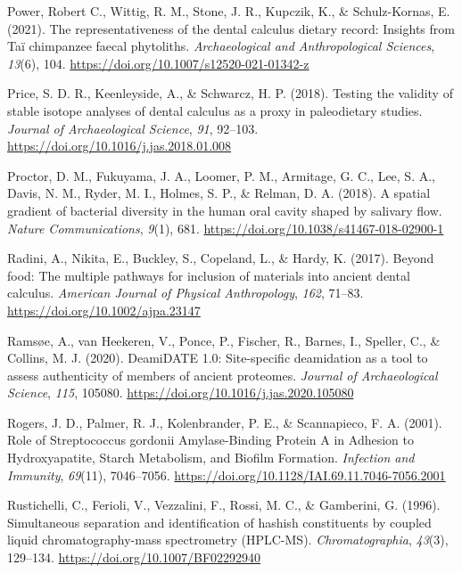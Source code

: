 \documentclass[
  letterpaper,
]{book}
\newlength{\cslhangindent}
\newlength{\cslentryspacingunit} %
\newenvironment{CSLReferences}[2] %
 {%
  \setlength{\parindent}{0pt}
  \ifodd #1
  \let\oldpar\par
  \def\par{\hangindent=\cslhangindent\oldpar}
  \fi
  \setlength{\parskip}{#2\cslentryspacingunit}
 }%
 {}
\begin{document}
\begin{CSLReferences}{1}{0}
\leavevmode{}%
Power, Robert C., Wittig, R. M., Stone, J. R., Kupczik, K., \&
Schulz-Kornas, E. (2021). The representativeness of the dental calculus
dietary record: Insights from {Taï} chimpanzee faecal phytoliths.
\emph{Archaeological and Anthropological Sciences}, \emph{13}(6), 104.
\url{https://doi.org/10.1007/s12520-021-01342-z}

\leavevmode{}%
Price, S. D. R., Keenleyside, A., \& Schwarcz, H. P. (2018). Testing the
validity of stable isotope analyses of dental calculus as a proxy in
paleodietary studies. \emph{Journal of Archaeological Science},
\emph{91}, 92--103. \url{https://doi.org/10.1016/j.jas.2018.01.008}

\leavevmode{}%
Proctor, D. M., Fukuyama, J. A., Loomer, P. M., Armitage, G. C., Lee, S.
A., Davis, N. M., Ryder, M. I., Holmes, S. P., \& Relman, D. A. (2018).
A spatial gradient of bacterial diversity in the human oral cavity
shaped by salivary flow. \emph{Nature Communications}, \emph{9}(1), 681.
\url{https://doi.org/10.1038/s41467-018-02900-1}

\leavevmode{}%
Radini, A., Nikita, E., Buckley, S., Copeland, L., \& Hardy, K. (2017).
Beyond food: {The} multiple pathways for inclusion of materials into
ancient dental calculus. \emph{American Journal of Physical
Anthropology}, \emph{162}, 71--83.
\url{https://doi.org/10.1002/ajpa.23147}

\leavevmode{}%
Ramsøe, A., van Heekeren, V., Ponce, P., Fischer, R., Barnes, I.,
Speller, C., \& Collins, M. J. (2020). {DeamiDATE} 1.0: {Site-specific}
deamidation as a tool to assess authenticity of members of ancient
proteomes. \emph{Journal of Archaeological Science}, \emph{115}, 105080.
\url{https://doi.org/10.1016/j.jas.2020.105080}

\leavevmode{}%
Rogers, J. D., Palmer, R. J., Kolenbrander, P. E., \& Scannapieco, F. A.
(2001). Role of {Streptococcus} gordonii {Amylase-Binding Protein A} in
{Adhesion} to {Hydroxyapatite}, {Starch Metabolism}, and {Biofilm
Formation}. \emph{Infection and Immunity}, \emph{69}(11), 7046--7056.
\url{https://doi.org/10.1128/IAI.69.11.7046-7056.2001}

\leavevmode{}%
Rustichelli, C., Ferioli, V., Vezzalini, F., Rossi, M. C., \& Gamberini,
G. (1996). Simultaneous separation and identification of hashish
constituents by coupled liquid chromatography-mass spectrometry
({HPLC-MS}). \emph{Chromatographia}, \emph{43}(3), 129--134.
\url{https://doi.org/10.1007/BF02292940}


\end{CSLReferences}
\end{document}
